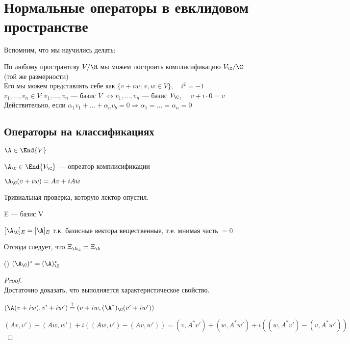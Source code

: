 \section*{Нормальные операторы в евклидовом пространстве}

Вспомним, что мы научились делать:

    По любому пространтсву $V / \R$ мы можем построить комплисификацию $V_{\C} / \C$ (той же размерности) \\
    Его мы можем представлять себе как $ \{ v + iw \, | \, v,w \in V \}, \quad i^2 = -1 $ \\
    $v_1, \dots, v_n \in V: v_1, \dots, v_n$ --- базис $V$ $\Longleftrightarrow v_1, \dots, v_n$ --- базис $V_{\C}$, $\quad v + i \cdot 0 = v$
    Действительно, если $\alpha_1 v_1 + \dots + \alpha_n v_b = 0 \Longrightarrow \alpha_1 = \dots = \alpha_n = 0$
    

\subsection*{Операторы на классификациях}

\begin{conj}
$ \A \in \End{V} $

$ \A_{\C} \in \End{V_{\C}}  $ --- опреатор комплисификации

$ \A_{\C}(v + iw) = Av + iAw $

Тривиальная проверка, которую лектор опустил.
\end{conj}

\begin{conj}
E --- базис V

$[\A_{\C}]_{E} = [\A]_{E}$ т.к. базисные вектора вещественные, т.е. мнимая часть $ = 0$

Отсюда следует, что $\Xi_{\A_{\C}} = \Xi_{\A}$
\end{conj}

\begin{theorem}() %
    $ (\A_{\C})^* = (\A)^*_{\C} $

    \begin{proof}
    $ $ \\
    Достаточно доказать, что выполняется характеристическое свойство.

    $(\A(v + iw), v' + iw') \stackrel{?}{=} (v + iw, (\A^*)_{\C}(v' + iw'))$

    $(A v, v') + (A w, w') + i ((A w, v') - (A v, w')) = (v, A^* v') + (w, A^* w') + i ( (w, A^* v') - (v, A^* w') )$ 
    \end{proof}
\end{theorem}

